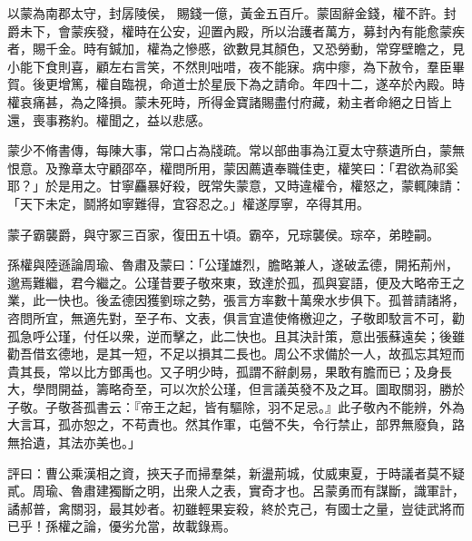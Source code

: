 \begin{pinyinscope}
 
以蒙為南郡太守，封孱陵侯，
 賜錢一億，黃金五百斤。蒙固辭金錢，權不許。封爵未下，會蒙疾發，權時在公安，迎置內殿，所以治護者萬方，募封內有能愈蒙疾者，賜千金。時有鍼加，權為之慘慼，欲數見其顏色，又恐勞動，常穿壁瞻之，見小能下食則喜，顧左右言笑，不然則咄唶，夜不能寐。病中瘳，為下赦令，羣臣畢賀。後更增篤，權自臨視，命道士於星辰下為之請命。年四十二，遂卒於內殿。時權哀痛甚，為之降損。蒙未死時，所得金寶諸賜盡付府藏，勑主者命絕之日皆上還，喪事務約。權聞之，益以悲感。
 
 
 
 
 蒙少不脩書傳，每陳大事，常口占為牋疏。常以部曲事為江夏太守蔡遺所白，蒙無恨意。及豫章太守顧邵卒，權問所用，蒙因薦遺奉職佳吏，權笑曰：「君欲為祁奚耶？」於是用之。甘寧麤暴好殺，旣常失蒙意，又時違權令，權怒之，蒙輒陳請：「天下未定，鬬將如寧難得，宜容忍之。」權遂厚寧，卒得其用。
 
 
 
 
 蒙子霸襲爵，與守冢三百家，復田五十頃。霸卒，兄琮襲侯。琮卒，弟睦嗣。
 
 
 
 
 孫權與陸遜論周瑜、魯肅及蒙曰：「公瑾雄烈，膽略兼人，遂破孟德，開拓荊州，邈焉難繼，君今繼之。公瑾昔要子敬來東，致達於孤，孤與宴語，便及大略帝王之業，此一快也。後孟德因獲劉琮之勢，張言方率數十萬衆水步俱下。孤普請諸將，咨問所宜，無適先對，至子布、文表，俱言宜遣使脩檄迎之，子敬即駮言不可，勸孤急呼公瑾，付任以衆，逆而擊之，此二快也。且其決計策，意出張蘇遠矣；後雖勸吾借玄德地，是其一短，不足以損其二長也。周公不求備於一人，故孤忘其短而貴其長，常以比方鄧禹也。又子明少時，孤謂不辭劇易，果敢有膽而已；及身長大，學問開益，籌略奇至，可以次於公瑾，但言議英發不及之耳。圖取關羽，勝於子敬。子敬荅孤書云：『帝王之起，皆有驅除，羽不足忌。』此子敬內不能辨，外為大言耳，孤亦恕之，不苟責也。然其作軍，屯營不失，令行禁止，部界無廢負，路無拾遺，其法亦美也。」
 
 
 
 
 評曰：曹公乘漢相之資，挾天子而掃羣桀，新盪荊城，仗威東夏，于時議者莫不疑貳。周瑜、魯肅建獨斷之明，出衆人之表，實奇才也。呂蒙勇而有謀斷，識軍計，譎郝普，禽關羽，最其妙者。初雖輕果妄殺，終於克己，有國士之量，豈徒武將而已乎！孫權之論，優劣允當，故載錄焉。
 
 
\end{pinyinscope}